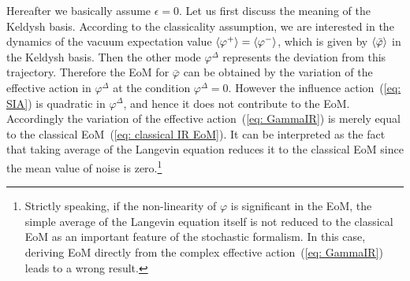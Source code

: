 \documentclass[a4paper,11pt]{article}
\begin{document}
Hereafter we basically assume $\epsilon=0$.
Let us first discuss the meaning of the Keldysh basis. According to the classicality assumption, we are interested in the dynamics of
the vacuum expectation value $\braket{\varphi^+}=\braket{\varphi^-}$, which is given by $\braket{\bar{\varphi}}$ in the Keldysh basis.
Then the other mode $\varphi^\Delta$ represents the deviation from this trajectory.
Therefore the EoM for $\bar{\varphi}$ can be obtained by the variation of the effective action in $\varphi^\Delta$ at the condition $\varphi^\Delta=0$.
However the influence action~(\ref{eq: SIA}) is quadratic in $\varphi^\Delta$, and hence it does not contribute to the EoM.
Accordingly the variation of the effective action~(\ref{eq: GammaIR}) is merely equal to the classical EoM~(\ref{eq: classical IR EoM}).
It can be interpreted as the fact that taking average of the Langevin equation reduces it to the classical EoM since the mean value of noise is 
zero.\footnote{Strictly speaking, if the non-linearity of $\varphi$ is significant in the EoM, the simple average of the Langevin equation itself is not
reduced to the classical EoM as an important feature of the stochastic formalism. In this case, deriving EoM directly from 
the complex effective action~(\ref{eq: GammaIR}) leads to a wrong result.}
\end{document}
